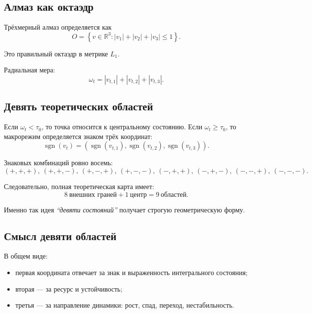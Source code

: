 \documentclass[12pt,a4paper]{article}
\begin{document}
\subsection{Алмаз как октаэдр}
Трёхмерный алмаз определяется как
\begin{equation}
O=
\left\{
v\in\mathbb{R}^3:
|v_1|+|v_2|+|v_3|\le 1
\right\}.
\end{equation}

Это правильный октаэдр в метрике $L_1$.

Радиальная мера:
\begin{equation}
\omega_t = |v_{t,1}|+|v_{t,2}|+|v_{t,3}|.
\end{equation}

\subsection{Девять теоретических областей}
Если $\omega_t < \tau_0$, то точка относится к центральному состоянию. Если $\omega_t \ge \tau_0$, то макрорежим определяется знаком трёх координат:
\begin{equation}
\operatorname{sgn}(v_t)=
\left(
\operatorname{sgn}(v_{t,1}),
\operatorname{sgn}(v_{t,2}),
\operatorname{sgn}(v_{t,3})
\right).
\end{equation}

Знаковых комбинаций ровно восемь:
\begin{equation}
(+,+,+),\ (+,+,-),\ (+,-,+),\ (+,-,-),\ (-,+,+),\ (-,+,-),\ (-,-,+),\ (-,-,-).
\end{equation}

Следовательно, полная теоретическая карта имеет:
\begin{equation}
8\ \text{внешних граней} + 1\ \text{центр} = 9\ \text{областей}.
\end{equation}

Именно так идея \textit{``девяти состояний''} получает строгую геометрическую форму.

\subsection{Смысл девяти областей}
В общем виде:
\begin{itemize}[leftmargin=1.25cm]
    \item первая координата отвечает за знак и выраженность интегрального состояния;
    \item вторая --- за ресурс и устойчивость;
    \item третья --- за направление динамики: рост, спад, переход, нестабильность.
\end{itemize}
\end{document}
